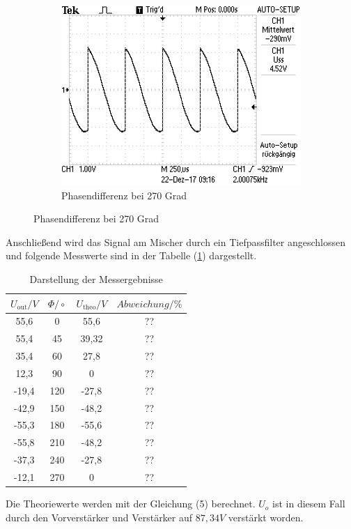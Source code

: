 \begin{figure}[H]
\begin{subfigure}{0.48\textwidth}
	\includegraphics[width=\textwidth]{270Grad.JPG}
  \caption{Phasendifferenz bei 270 Grad}
\end{subfigure}
\end{figure}

Anschließend wird das Signal am Mischer durch ein Tiefpassfilter angeschlossen und folgende
Messwerte sind in der Tabelle (\ref{tab:1}) dargestellt.
\begin{table}[H]
\centering
\caption{Darstellung der Messergebnisse}
\label{tab:1}
 \begin{tabular}{c c c c}
  \toprule
     $U_\text{out} / V$ & $\Phi/\circ$ & $U_\text{theo} / V$ & $Abweichung / \%$ \\
  \midrule
  55,6  & 0   & 55,6  &??\\
  55,4  & 45  & 39,32 &??\\
  35,4  & 60  & 27,8  &??\\
  12,3  & 90  &   0   &??\\
  -19,4 & 120 &-27,8  &??\\
  -42,9 & 150 &-48,2  &??\\
  -55,3 & 180 &-55,6  &??\\
  -55,8 & 210 &-48,2  &??\\
  -37,3 & 240 &-27,8  &??\\
  -12,1 & 270 &   0   &??\\
  \bottomrule
\end{tabular}
\end{table}
Die Theoriewerte werden mit der Gleichung (5) berechnet. $U_o$ ist in diesem Fall durch den Vorverstärker
und Verstärker auf $87,34 V$ verstärkt worden.

